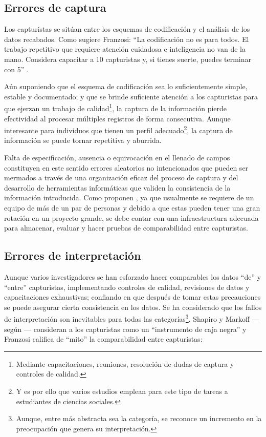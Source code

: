 \documentclass[letterpaper, 11pt]{book}
\theoremstyle{definition}
\theoremstyle{remark}
\begin{document}
\subsection{Errores de captura}
\label{sec:Sesgo_captura}

Los capturistas se sitúan entre los esquemas de codificación y el análisis de los datos recabados. 
Como sugiere Franzosi: ``La codificación no es para todos. El trabajo repetitivo que requiere atención cuidadosa e inteligencia no van de la mano. Considera capacitar a 10 capturistas y, si tienes suerte, puedes terminar con 5'' \citep[149]{2010_Franzosi_QNA}.

Aún suponiendo que el esquema de codificación sea lo suficientemente simple, estable y documentado; y que se brinde suficiente atención a los capturistas para que ejerzan un trabajo de calidad\footnote{Mediante capacitaciones, reuniones, resolución de dudas de captura y controles de calidad.}, la captura de la información pierde efectividad al procesar múltiples registros de forma consecutiva. 
Aunque interesante para individuos que tienen un perfil adecuado\footnote{Y es por ello que varios estudios emplean para este tipo de tareas a estudiantes de ciencias sociales.}, la captura de información se puede tornar repetitiva y aburrida.

Falta de especificación, ausencia o equivocación en el llenado de campos constituyen en este sentido errores aleatorios no intencionados que pueden ser mermados a través de una organización eficaz del proceso de captura y del desarrollo de herramientas informáticas que validen la consistencia de la información introducida. 
Como proponen \citet{2002_Koopmans_AEP}, ya que usualmente se requiere de un equipo de más de un par de personas y debido a que estas pueden tener una gran rotación en un proyecto grande, se debe contar con una infraestructura adecuada para almacenar, evaluar y hacer pruebas de comparabilidad entre capturistas.



\subsection{Errores de interpretación}
\label{sec:Sesgo_procesamiento}

Aunque varios investigadores se han esforzado hacer comparables los datos ``de'' y ``entre'' capturistas, implementando controles de calidad, revisiones de datos y capacitaciones exhaustivas; confiando en que después de tomar estas precauciones se puede asegurar cierta consistencia en los datos. 
Se ha considerado que los fallos de interpretación son inevitables para todas las categorías\footnote{Aunque, entre más abstracta sea la categoría, se reconoce un incremento en la preocupación que genera su interpretación.}. 
Shapiro y Markoff ---según \citep[144]{2003_Wada_Tesis}--- consideran a los capturistas como un ``instrumento de caja negra'' y Franzosi califica de ``mito'' la comparabilidad entre capturistas:
\end{document}
